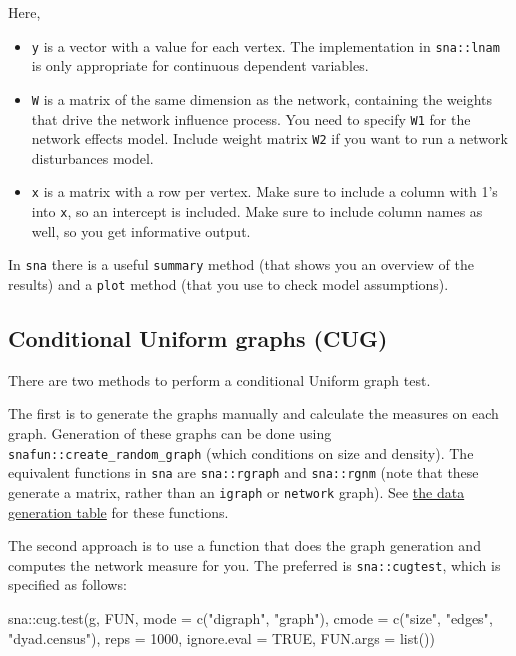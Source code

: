 \documentclass[
]{article}
\newenvironment{Shaded}{\begin{snugshade}}{\end{snugshade}}
\newcommand{\AttributeTok}[1]{\textcolor[rgb]{0.77,0.63,0.00}{#1}}
\newcommand{\ConstantTok}[1]{\textcolor[rgb]{0.00,0.00,0.00}{#1}}
\newcommand{\DecValTok}[1]{\textcolor[rgb]{0.00,0.00,0.81}{#1}}
\newcommand{\FunctionTok}[1]{\textcolor[rgb]{0.00,0.00,0.00}{#1}}
\newcommand{\NormalTok}[1]{#1}
\newcommand{\SpecialCharTok}[1]{\textcolor[rgb]{0.00,0.00,0.00}{#1}}
\newcommand{\StringTok}[1]{\textcolor[rgb]{0.31,0.60,0.02}{#1}}
\begin{document}
Here,

\begin{itemize}
\item
  \texttt{y} is a vector with a value for each vertex. The
  implementation in \texttt{sna::lnam} is only appropriate for
  continuous dependent variables.
\item
  \texttt{W} is a matrix of the same dimension as the network,
  containing the weights that drive the network influence process. You
  need to specify \texttt{W1} for the network effects model. Include
  weight matrix \texttt{W2} if you want to run a network disturbances
  model.
\item
  \texttt{x} is a matrix with a row per vertex. Make sure to include a
  column with 1's into \texttt{x}, so an intercept is included. Make
  sure to include column names as well, so you get informative output.
\end{itemize}

In \texttt{sna} there is a useful \texttt{summary} method (that shows
you an overview of the results) and a \texttt{plot} method (that you use
to check model assumptions).

\hypertarget{conditional-uniform-graphs-cug}{%
\subsection{Conditional Uniform graphs
(CUG)}\label{conditional-uniform-graphs-cug}}

There are two methods to perform a conditional Uniform graph test.

The first is to generate the graphs manually and calculate the measures
on each graph. Generation of these graphs can be done using
\texttt{snafun::create\_random\_graph} (which conditions on size and
density). The equivalent functions in \texttt{sna} are
\texttt{sna::rgraph} and \texttt{sna::rgnm} (note that these generate a
matrix, rather than an \texttt{igraph} or \texttt{network} graph). See
\protect\hyperlink{generate}{the data generation table} for these
functions.

The second approach is to use a function that does the graph generation
and computes the network measure for you. The preferred is
\texttt{sna::cugtest}, which is specified as follows:

\begin{Shaded}
\begin{Highlighting}[]
\NormalTok{sna}\SpecialCharTok{::}\FunctionTok{cug.test}\NormalTok{(g, FUN, }\AttributeTok{mode =} \FunctionTok{c}\NormalTok{(}\StringTok{"digraph"}\NormalTok{, }\StringTok{"graph"}\NormalTok{), }\AttributeTok{cmode =} \FunctionTok{c}\NormalTok{(}\StringTok{"size"}\NormalTok{,}
    \StringTok{"edges"}\NormalTok{, }\StringTok{"dyad.census"}\NormalTok{), }\AttributeTok{reps =} \DecValTok{1000}\NormalTok{,}
    \AttributeTok{ignore.eval =} \ConstantTok{TRUE}\NormalTok{, }\AttributeTok{FUN.args =} \FunctionTok{list}\NormalTok{())}
\end{Highlighting}
\end{Shaded}
\end{document}
